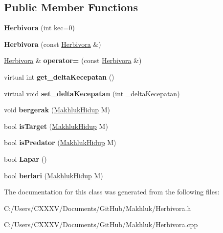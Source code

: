 \subsection*{Public Member Functions}
\begin{DoxyCompactItemize}
\item 
{\bfseries Herbivora} (int kec=0)\hypertarget{class_herbivora_ae9bb69aad7262058bc211c0a62666f0a}{}\label{class_herbivora_ae9bb69aad7262058bc211c0a62666f0a}

\item 
{\bfseries Herbivora} (const \hyperlink{class_herbivora}{Herbivora} \&)\hypertarget{class_herbivora_a754ef435d7a6a6bffe727e809e5f211b}{}\label{class_herbivora_a754ef435d7a6a6bffe727e809e5f211b}

\item 
\hyperlink{class_herbivora}{Herbivora} \& {\bfseries operator=} (const \hyperlink{class_herbivora}{Herbivora} \&)\hypertarget{class_herbivora_aa57f800351a4b1fa8dc6139476e14d38}{}\label{class_herbivora_aa57f800351a4b1fa8dc6139476e14d38}

\item 
virtual int {\bfseries get\+\_\+delta\+Kecepatan} ()\hypertarget{class_herbivora_a60f1095412a18804afd582dbba89415b}{}\label{class_herbivora_a60f1095412a18804afd582dbba89415b}

\item 
virtual void {\bfseries set\+\_\+delta\+Kecepatan} (int \+\_\+delta\+Kecepatan)\hypertarget{class_herbivora_a258ec1047fc84b614c39ba21b18b0db9}{}\label{class_herbivora_a258ec1047fc84b614c39ba21b18b0db9}

\item 
void {\bfseries bergerak} (\hyperlink{class_makhluk_hidup}{Makhluk\+Hidup} M)\hypertarget{class_herbivora_adbcaa03a6b1a3e541d2e1b158ac39547}{}\label{class_herbivora_adbcaa03a6b1a3e541d2e1b158ac39547}

\item 
bool {\bfseries is\+Target} (\hyperlink{class_makhluk_hidup}{Makhluk\+Hidup} M)\hypertarget{class_herbivora_a0a58c1f54c818532cb8b6bc7edca5d46}{}\label{class_herbivora_a0a58c1f54c818532cb8b6bc7edca5d46}

\item 
bool {\bfseries is\+Predator} (\hyperlink{class_makhluk_hidup}{Makhluk\+Hidup} M)\hypertarget{class_herbivora_a5bfea7544cad5c16807b24a823bdc74d}{}\label{class_herbivora_a5bfea7544cad5c16807b24a823bdc74d}

\item 
bool {\bfseries Lapar} ()\hypertarget{class_herbivora_a7b858779a87a0594915868676eab9854}{}\label{class_herbivora_a7b858779a87a0594915868676eab9854}

\item 
bool {\bfseries berlari} (\hyperlink{class_makhluk_hidup}{Makhluk\+Hidup} M)\hypertarget{class_herbivora_abe65c21a321839fca1210ac6cc1933ca}{}\label{class_herbivora_abe65c21a321839fca1210ac6cc1933ca}

\end{DoxyCompactItemize}


The documentation for this class was generated from the following files\+:\begin{DoxyCompactItemize}
\item 
C\+:/\+Users/\+C\+X\+X\+X\+V/\+Documents/\+Git\+Hub/\+Makhluk/Herbivora.\+h\item 
C\+:/\+Users/\+C\+X\+X\+X\+V/\+Documents/\+Git\+Hub/\+Makhluk/Herbivora.\+cpp\end{DoxyCompactItemize}

